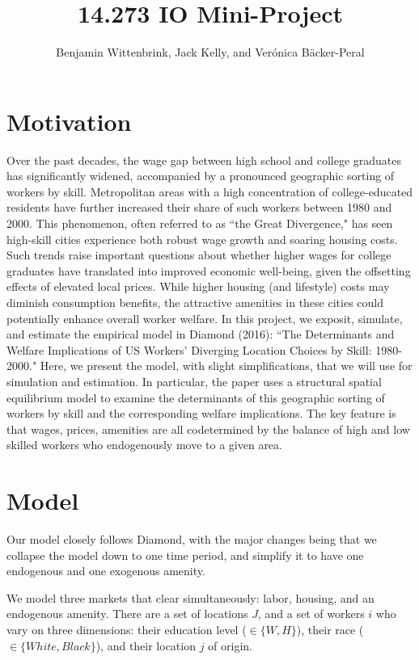 \documentclass{article}
\title{14.273 IO Mini-Project}
\author{Benjamin Wittenbrink, Jack Kelly, and Verónica Bäcker-Peral}
\begin{document}
\maketitle

\section{Motivation}

Over the past decades, the wage gap between high school and college graduates has significantly widened, accompanied by a pronounced geographic sorting of workers by skill. Metropolitan areas with a high concentration of college-educated residents have further increased their share of such workers between 1980 and 2000. This phenomenon, often referred to as ``the Great Divergence," has seen high-skill cities experience both robust wage growth and soaring housing costs. Such trends raise important questions about whether higher wages for college graduates have translated into improved economic well-being, given the offsetting effects of elevated local prices. While higher housing (and lifestyle) costs may diminish consumption benefits, the attractive amenities in these cities could potentially enhance overall worker welfare. In this project, we exposit, simulate, and estimate the empirical model in Diamond (2016): ``The Determinants and Welfare Implications of US Workers' Diverging Location Choices by Skill: 1980-2000." Here, we present the model, with slight simplifications, that we will use for simulation and estimation. 
In particular, the paper uses a structural spatial equilibrium model to examine the determinants of this geographic sorting of workers by skill and the corresponding welfare implications. The key feature is that wages, prices, amenities are all codetermined by the balance of high and low skilled workers who endogenously move to a given area. 

\section{Model}

Our model closely follows Diamond, with the major changes being that we collapse the model down to one time period, and simplify it to have one endogenous and one exogenous amenity. 

We model three markets that clear simultaneously: labor, housing, and an endogenous amenity. There are a set of locations $J$, and a set of workers $i$ who vary on three dimensions: their education level ($\in \{W,H\}$), their race ($\in \{White,Black\}$), and their  location $j$ of origin. 
\end{document}
